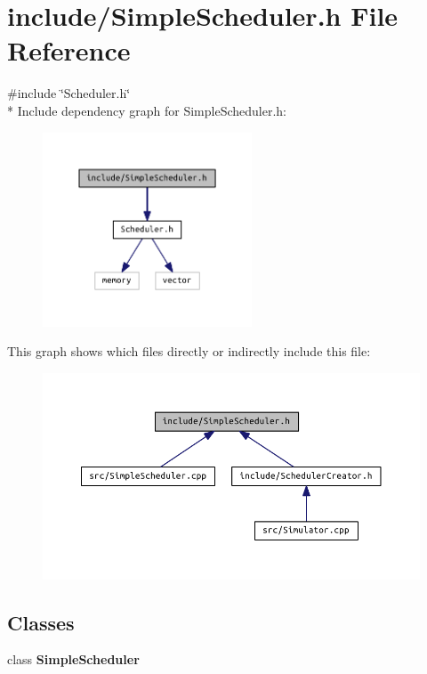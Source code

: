 \section{include/\+Simple\+Scheduler.h File Reference}
\label{_simple_scheduler_8h}
{\ttfamily \#include \char`\"{}Scheduler.\+h\char`\"{}}\\*
Include dependency graph for Simple\+Scheduler.\+h\+:\nopagebreak
\begin{figure}[H]
\begin{center}
\leavevmode
\includegraphics[width=176pt]{_simple_scheduler_8h__incl}
\end{center}
\end{figure}
This graph shows which files directly or indirectly include this file\+:\nopagebreak
\begin{figure}[H]
\begin{center}
\leavevmode
\includegraphics[width=322pt]{_simple_scheduler_8h__dep__incl}
\end{center}
\end{figure}
\subsection*{Classes}
\begin{DoxyCompactItemize}
\item 
class {\bf Simple\+Scheduler}
\end{DoxyCompactItemize}
